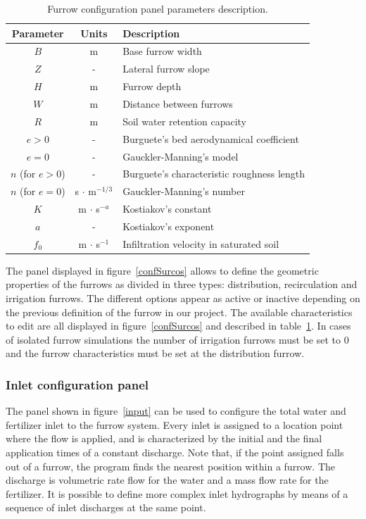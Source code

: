 \documentclass[review,authoryear]{elsarticle}
\begin{document}
\begin{table}[!ht]\footnotesize
\centering
\caption{Furrow configuration panel parameters description.}\label{tabSurcos}
\begin{tabular}{ccl}
\hline
Parameter & Units & Description \\
\hline
$B$ & m & Base furrow width \\
$Z$ & - & Lateral furrow slope \\
$H$ & m & Furrow depth \\
$W$ & m & Distance between furrows \\
$R$ & m & Soil water retention capacity \\
$e>0$ & - & Burguete's bed aerodynamical coefficient \\
$e=0$ & - & Gauckler-Manning's model \\
$n$ (for $e>0$) & - & Burguete's characteristic roughness length \\ 
$n$ (for $e=0$) & s $\cdot$ m$^{-1/3}$ & Gauckler-Manning's number \\
$K$ & m $\cdot$ s$^{-a}$ & Kostiakov's constant \\
$a$ & - & Kostiakov's exponent \\
$f_0$ & m $\cdot$ s$^{-1}$ & Infiltration velocity in saturated soil \\
\hline
\end{tabular}
\end{table}

The panel displayed in figure~\ref{confSurcos} allows to define the geometric
properties of the furrows as divided in three types: distribution, recirculation
and irrigation furrows. The different options appear as active or inactive
depending on the previous definition of the furrow in our project. The available
characteristics to edit are all displayed in figure~\ref{confSurcos} and described in table~\ref{tabSurcos}. In cases
of isolated furrow simulations the number of irrigation furrows must be set to 0
and the furrow characteristics must be set at the distribution furrow.

\subsubsection{Inlet configuration panel}

The panel shown in figure~\ref{input} can be used to configure the total water
and fertilizer inlet to the furrow system. Every inlet is assigned to a location
point where the flow is applied, and is characterized by the initial and the
final application times of a constant discharge. Note that, if the point
assigned falls out of a furrow, the program finds the nearest position within a
furrow. The discharge is volumetric rate flow for the water and a mass flow rate
for the fertilizer. It is possible to define more complex inlet hydrographs by
means of a sequence of inlet discharges at the same point. 
\end{document}
